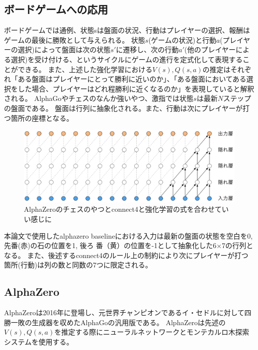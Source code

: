\subsection{ボードゲームへの応用}
ボードゲームでは通例、状態sは盤面の状況、行動はプレイヤーの選択、報酬はゲームの最後に勝敗として与えられる。
状態$s$(ゲームの状況)と行動$a$(プレイヤーの選択)によって盤面は次の状態$s'$に遷移し、次の行動$a'$(他のプレイヤーによる選択)を受け付ける、というサイクルにゲームの進行を定式化して表現することができる。
また、上述した強化学習における$V(s),Q(s, a)$の推定はそれぞれ「ある盤面はプレイヤーにとって勝利に近いのか」、「ある盤面においてある選択をした場合、プレイヤーはどれ程勝利に近くなるのか」を表現していると解釈される。
AlphaGo\cite{oord2016wavenet}やチェスのなんか強いやつ\cite{oord2016wavenet}、激指\cite{oord2016wavenet}では状態$s$は最新$N$ステップの盤面である。
盤面は行列に抽象化される。また、行動は次にプレイヤーが打つ箇所の座標となる。
\begin{figure}[t]
	\centering
	\includegraphics[width=\linewidth]{./figure/ccl.png}
	\caption{AlphaZeroのチェスのやつとconnect4と強化学習の式を合わせていい感じに}
	\label{fig:ccl}
\end{figure}
本論文で使用したalphazero baselineにおける入力は最新の盤面の状態を空白を0, 先番(赤)の石の位置を1, 後ろ
番（黄）の位置を-1として抽象化した6$\times$7の行列となる。
また、後述するconnect4のルール上の制約により次にプレイヤーが打つ箇所(行動)は列の数と同数の7つに限定される。

\subsection{AlphaZero}
AlphaZeroは2016年に登場し、元世界チャンピオンであるイ・セドルに対して四勝一敗の生成器を収めたAlphaGoの汎用版である。
AlphaZeroは先述の$V(s),Q(s, a)$を推定する際にニューラルネットワークとモンテカルロ木探索システムを使用する。
